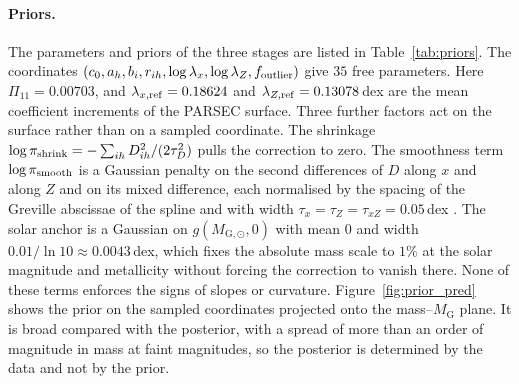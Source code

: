 \documentclass{aa}
\begin{document}
\begin{appendix}
\paragraph{Priors.} The parameters and priors of the three stages are listed in Table~\ref{tab:priors}. The coordinates $(c_0,a_h,b_i,r_{ih},\log\lambda_x,\log\lambda_Z,f_{\rm outlier})$ give $35$ free parameters. Here $\Pi_{11}=0.00703$, and $\lambda_{x,\rm ref}=0.18624$ and $\lambda_{Z,\rm ref}=0.13078$\,dex are the mean coefficient increments of the PARSEC surface. Three further factors act on the surface rather than on a sampled coordinate. The shrinkage $\log\pi_{\rm shrink}=-\sum_{ih}D_{ih}^2/(2\tau_D^2)$ pulls the correction to zero. The smoothness term $\log\pi_{\rm smooth}$ is a Gaussian penalty on the second differences of $D$ along $x$ and along $Z$ and on its mixed difference, each normalised by the spacing of the Greville abscissae of the spline and with width $\tau_x=\tau_Z=\tau_{xZ}=0.05$\,dex \citep{EilersMarx1996PSplines}. The solar anchor is a Gaussian on $g(M_{\mathrm{G},\odot},0)$ with mean $0$ and width $0.01/\ln10\approx0.0043$\,dex, which fixes the absolute mass scale to $1\%$ at the solar magnitude and metallicity without forcing the correction to vanish there. None of these terms enforces the signs of slopes or curvature. Figure~\ref{fig:prior_pred} shows the prior on the sampled coordinates projected onto the mass--$M_{\mathrm{G}}$ plane. It is broad compared with the posterior, with a spread of more than an order of magnitude in mass at faint magnitudes, so the posterior is determined by the data and not by the prior.


\end{appendix}
\end{document}
